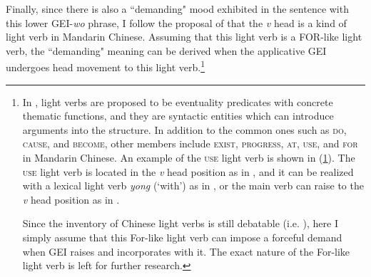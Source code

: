 \documentclass[output=paper,colorlinks,citecolor=brown]{langscibook}
\begin{document}
Finally, since there is also a “demanding" mood exhibited in the sentence with this lower GEI-\textit{wo} phrase, I follow the proposal of \citet{Lin2001} that the \textit{v} head is a kind of light verb in Mandarin Chinese. Assuming that this light verb is a FOR-like light verb, the “demanding" meaning can be derived when the applicative GEI undergoes head movement to this light verb.\footnote{In \citet{Lin2001}, light verbs are proposed to be eventuality predicates with concrete thematic functions, and they are syntactic entities which can introduce arguments into the structure. In addition to the common ones such as \textsc{do}, \textsc{cause}, and \textsc{become}, other members include \textsc{exist}, \textsc{progress}, \textsc{at}, \textsc{use}, and \textsc{for} in Mandarin Chinese. An example of the \textsc{use} light verb is shown in (\ref{kuos}). The \textsc{use} light verb is located in the \textit{v} head position as in , and it can be realized with a lexical light verb \textit{yong} (`with') as in , or the main verb can raise to the \textit{v} head position as in .
\ea
\label{kuos}
    \z
\z

Since the inventory of Chinese light verbs is still debatable (i.e. \citealt{Tsai2012}), here I simply assume that this For-like light verb can impose a forceful demand when GEI raises and incorporates with it. The exact nature of the For-like light verb is left for further research.}
\end{document}

